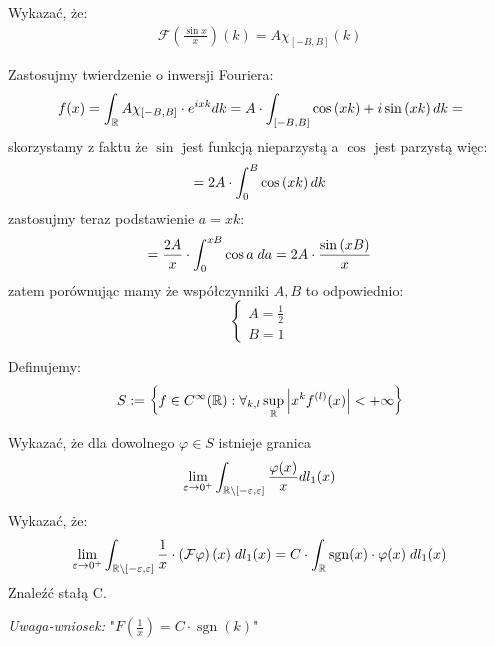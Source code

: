 \documentclass[11pt]{scrartcl}
\DeclareMathOperator{\sgn}{sgn}
\begin{document}
    \newpage

    \begin{zadanie*}
        Wykazać, że:
        \begin{gather*}
            \mathcal{F} \left ( \frac{\sin x}{x} \right ) (k) = A \chi_{[- B, B]} (k)
        \end{gather*}
    \end{zadanie*}

    Zastosujmy twierdzenie o inwersji Fouriera:
    \[
        f(x) = \int_{\mathbb R} A \chi_{[-B, B]} \cdot e^{i x k} dk = 
        A \cdot \int_{[-B, B]} \cos \left ( x k \right ) + i \sin \left ( x k \right ) dk =
    \]
    skorzystamy z faktu że $\sin$ jest funkcją nieparzystą a $\cos$ jest parzystą więc:
    \[
        = 2A \cdot \int_0^B \cos \left ( x k \right ) dk
    \]
    zastosujmy teraz podstawienie $a = x k$:
    \[
        = \frac{2 A}{x} \cdot \int_0^{x B} \cos a \; da 
        = 2 A \cdot \frac{\sin \left ( x B \right )}{x}
    \]
    zatem porównując mamy że współczynniki $A, B$ to odpowiednio:
    \[
        \begin{cases}
            A = \frac{1}{2} \\
            B = 1
        \end{cases}
    \]

    \newpage

    \begin{zadanie*}
        Definujemy:
        \[
            S := \left \{ f \in C^{\infty } (\mathbb R) : 
                \forall_{k,l} \sup_{\mathbb R} \left\lvert x^k f^{(l)} (x) \right\rvert < + \infty   \right \}
        \]

        \begin{walk}
            \item Wykazać, że dla dowolnego $\varphi \in S$ istnieje granica
                \[
                    \lim_{\varepsilon \to 0^+} \int_{\mathbb R \backslash [-\varepsilon, \varepsilon]} 
                        \frac{\varphi (x)}{x} dl_1 (x)  
                \]
            \item Wykazać, że:
                \[
                     \lim_{\varepsilon \to 0^+} \int_{\RR \backslash [-\varepsilon, \varepsilon]} 
                         \frac{1}{x} \cdot \left ( \mathcal{F} \varphi  \right ) (x) \; dl_1 (x) =
                         C \cdot \int_{\RR} \sgn (x) \cdot \varphi (x) \; dl_1(x)
                \]
                Znaleźć stałą C.
        \end{walk}

        \textit{Uwaga-wniosek:} "$F \left ( \frac{1}{x} \right ) = C \cdot \sgn (k)$" 
    \end{zadanie*}
    
\end{document}
